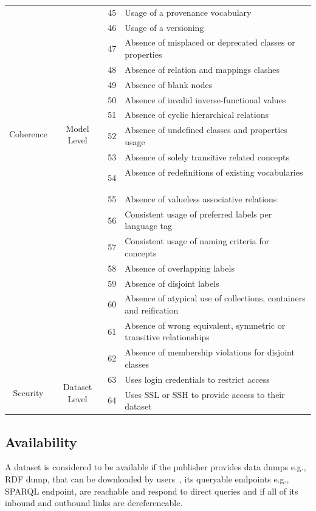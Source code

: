 \documentclass[onecolumn, crcready]{../../Tools/LaTEX/iosart2c}
\begin{document}
\begin{center}
{\begin{longtable}[h]{|c|c|c|l|}
\cline{3-4}
 &  & 45 & Usage of a provenance vocabulary\tabularnewline
 \cline{3-4}
 &  & 46 & Usage of a versioning\tabularnewline
\hline
\hline
\multirow{10}{*}{Coherence} & \multirow{10}{*}{Model Level} & 47 & Absence of misplaced or deprecated classes or properties ~\cite{Hogan:LDOW:10}\tabularnewline
\cline{3-4}
 &  & 48 & Absence of relation and mappings clashes ~\cite{Suominen:IKEM:12}\tabularnewline
\cline{3-4}
 &  & 49 & Absence of blank nodes~\cite{Hogan:WebSemJorunal:12}\tabularnewline
\cline{3-4}
 &  & 50 & Absence of invalid inverse-functional values~\cite{Hogan:LDOW:10}\tabularnewline
\cline{3-4}
 &  & 51 & Absence of cyclic hierarchical relations~\cite{Dagobert:DL:02,Suominen:IKEM:12,Mader:TBDL:12}\tabularnewline
\cline{3-4}
 &  & 52 & Absence of undefined classes and properties usage~\cite{Hogan:LDOW:10}\tabularnewline
\cline{3-4}
 &  & 53 & Absence of solely transitive related concepts~\cite{Mader:TBDL:12}\tabularnewline
\cline{3-4}
 &  & 54 & Absence of redefinitions of existing vocabularies ~\cite{Hogan:LDOW:10}\tabularnewline
\cline{3-4}
 &  & 55 & Absence of valueless associative relations ~\cite{Mader:TBDL:12}\tabularnewline
\hline
\hline
\multirow{7}{*}{Consistency}
 & \multirow{7}{*}{Model Level}
& 56 & Consistent usage of preferred labels per language tag~\cite{Isaac:W3C:09,Mader:TBDL:12}\tabularnewline
 \cline{3-4}
 & & 57 & Consistent usage of naming criteria for concepts~\cite{Maria:KEOD:13}\tabularnewline
\cline{3-4}
 &  & 58 & Absence of overlapping labels\tabularnewline
\cline{3-4}
 &  & 59 & Absence of disjoint labels~\cite{Mader:TBDL:12}\tabularnewline
\cline{3-4}
 & & 60 & Absence of atypical use of collections, containers and reification~\cite{Hogan:LDOW:10}\tabularnewline
\cline{3-4}
 &  & 61 & Absence of wrong equivalent, symmetric or transitive relationships~\cite{Maria:KEOD:13}\tabularnewline
\cline{3-4}
 &  & 62 & Absence of membership violations for disjoint classes~\cite{Hogan:LDOW:10}\tabularnewline
\hline
\hline
\multirow{2}{*}{Security} & \multirow{2}{*}{Dataset Level} & 63 & Uses login credentials to restrict access~\cite{Zaveri:SemWebJorunal:12}\tabularnewline
\cline{3-4}
 &  & 64 & Uses SSL or SSH to provide access to their dataset~\cite{Zaveri:SemWebJorunal:12}\tabularnewline
\hline
\end{longtable}
}
\end{center}

\subsection{Availability}
A dataset is considered to be available if the publisher provides data dumps e.g., RDF dump, that can be downloaded by users~\cite{Flemming:Thesis:10,Hogan:LDOW:10}, its queryable endpoints e.g., SPARQL endpoint, are reachable and respond to direct queries and if all of its inbound and outbound links are dereferencable.
\end{document}
